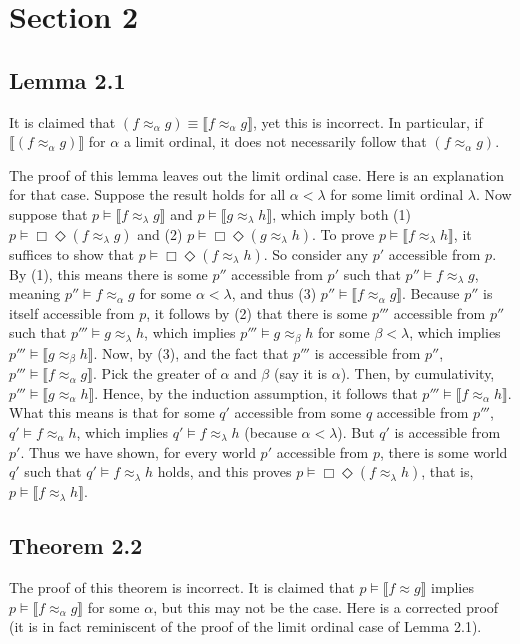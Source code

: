 \documentclass{article}
\newcommand{\lbc}{\llbracket}
\newcommand{\rbc}{\rrbracket}
\theoremstyle{definition}
\begin{document}
\section*{Section 2}

\subsection*{Lemma 2.1}
It is claimed that $(f\approx_\alpha g)\equiv\lbc f\approx_\alpha g\rbc$, yet this is incorrect. In particular, if 
$\lbc (f\approx_\alpha g)\rbc$ for $\alpha$ a limit ordinal, it does not necessarily follow that $(f\approx_\alpha g)$.

The proof of this lemma leaves out the limit ordinal case. Here is an explanation for that case. Suppose the 
result holds for all $\alpha<\lambda$ for some limit ordinal $\lambda$. Now suppose that 
$p\vDash\lbc f\approx_\lambda g\rbc$ and $p\vDash\lbc g\approx_\lambda h\rbc$, which imply both 
(1) $p\vDash\Box\Diamond(f\approx_\lambda g)$ and (2) $p\vDash\Box\Diamond(g\approx_\lambda h)$. To prove 
$p\vDash\lbc f\approx_\lambda h\rbc$, it suffices to show that 
$p\vDash\Box\Diamond(f\approx_\lambda h)$. So consider any $p'$ accessible from $p$. By (1), this means there is some 
$p''$ accessible from $p'$ such that $p''\vDash f\approx_\lambda g$, meaning 
$p''\vDash f\approx_\alpha g$ for some $\alpha<\lambda$, and thus (3) $p''\vDash\lbc f\approx_\alpha g\rbc$.
Because $p''$ is itself accessible from $p$, it follows by (2) that there is some $p'''$ accessible from $p''$ such 
that $p'''\vDash g\approx_\lambda h$, which implies $p'''\vDash g\approx_\beta h$ for some $\beta<\lambda$, which implies 
$p'''\vDash \lbc g\approx_\beta h\rbc$. Now, by (3), and the fact that $p'''$ is accessible from $p''$, 
$p'''\vDash\lbc f\approx_\alpha g\rbc$. Pick the greater of $\alpha$ and $\beta$ (say it is $\alpha$).
Then, by cumulativity, $p'''\vDash \lbc g\approx_\alpha h\rbc$. Hence, by the induction assumption, it follows that 
$p'''\vDash\lbc f\approx_\alpha h\rbc$. What this means is that for some $q'$ accessible from some $q$ accessible from 
$p'''$, $q'\vDash f\approx_\alpha h$, which implies $q'\vDash f\approx_\lambda h$ (because $\alpha<\lambda$). 
But $q'$ is accessible from $p'$. Thus we have shown, for every world 
$p'$ accessible from $p$, there is some world $q'$ such that $q'\vDash f\approx_\lambda h$ holds, and this proves 
$p\vDash\Box\Diamond (f\approx_\lambda h)$, that is, $p\vDash\lbc f\approx_\lambda h\rbc$. 

\subsection*{Theorem 2.2}
The proof of this theorem is incorrect. It is claimed that $p\vDash\lbc f\approx g\rbc$ implies 
$p\vDash\lbc f\approx_\alpha g\rbc$ for some $\alpha$, but this may not be the case. Here is a corrected proof (it is in fact
reminiscent of the proof of the limit ordinal case of Lemma 2.1).
\end{document}
